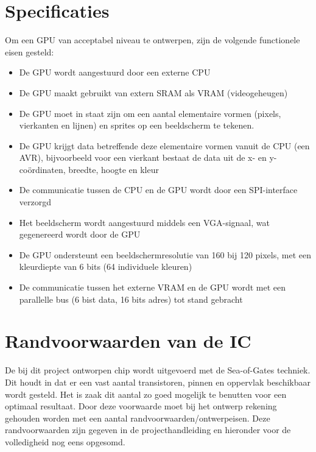 \documentclass{scrartcl} %
\begin{document}
\section{Specificaties}
Om een GPU van acceptabel niveau te ontwerpen, zijn de volgende functionele eisen gesteld:

\begin{itemize}
	\item De GPU wordt aangestuurd door een externe CPU
	\item De GPU maakt gebruikt van extern SRAM als VRAM (videogeheugen)
	\item De GPU moet in staat zijn om een aantal elementaire vormen (pixels, vierkanten en lijnen) en sprites op een beeldscherm te tekenen.
	\item De GPU krijgt data betreffende deze elementaire vormen vanuit de CPU (een AVR), bijvoorbeeld voor een vierkant bestaat de data uit de x- en y-coördinaten, breedte, hoogte en kleur
	\item De communicatie tussen de CPU en de GPU wordt door een SPI-interface verzorgd
	\item Het beeldscherm wordt aangestuurd middels een VGA-signaal, wat gegenereerd wordt door de GPU
	\item De GPU ondersteunt een beeldschermresolutie van 160 bij 120 pixels, met een kleurdiepte van 6 bits (64 individuele kleuren)
	\item De communicatie tussen het externe VRAM en de GPU wordt met een parallelle bus (6 bist data, 16 bits adres) tot stand gebracht
\end{itemize}

\section {Randvoorwaarden van de IC}

De bij dit project ontworpen chip wordt uitgevoerd met de Sea-of-Gates techniek. Dit houdt in dat er een vast aantal transistoren, pinnen en oppervlak beschikbaar wordt gesteld. Het is zaak dit aantal zo goed mogelijk te benutten voor een optimaal resultaat. Door deze voorwaarde moet bij het ontwerp rekening gehouden worden met een aantal randvoorwaarden/ontwerpeisen. Deze randvoorwaarden zijn gegeven in de projecthandleiding en hieronder voor de volledigheid nog eens opgesomd. \cite{epo3-manual}
\end{document}
